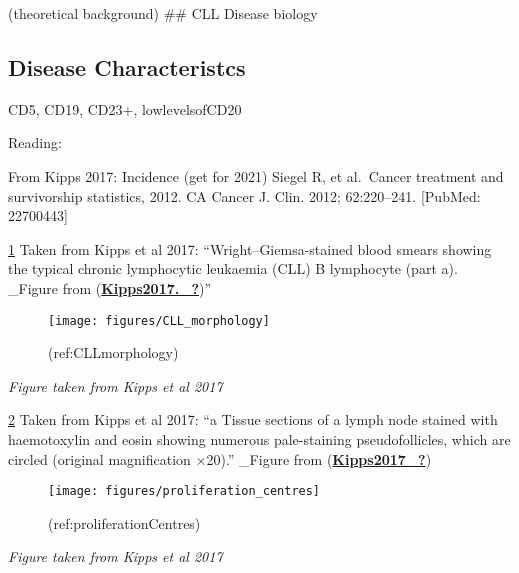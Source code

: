 \documentclass[11pt, a4paper, twosided]{book}
\begin{document}
(theoretical background)
\#\# CLL Disease biology

\hypertarget{disease-characteristcs}{%
\subsection{Disease Characteristcs}\label{disease-characteristcs}}

CD5, CD19, CD23+, lowlevelsofCD20

Reading:

From Kipps 2017:
Incidence (get for 2021)
Siegel R, et al.~Cancer treatment and survivorship statistics, 2012. CA Cancer J. Clin. 2012; 62:220--241. {[}PubMed: 22700443{]}

\ref{fig:CLLmorphology} Taken from Kipps et al 2017: ``Wright--Giemsa-stained blood smears showing the typical chronic lymphocytic leukaemia (CLL) B lymphocyte (part a). \_Figure from (\protect\hyperlink{ref-Kipps2017._}{\textbf{Kipps2017.\_?}})''
\begin{figure}

{\centering \texttt{[image: figures/CLL\_morphology]} 

}

\caption{(ref:CLLmorphology)}\label{fig:CLLmorphology}
\end{figure}
\emph{Figure taken from Kipps et al 2017}

\ref{fig:proliferationCentres} Taken from Kipps et al 2017: ``a \textbar{} Tissue sections of a lymph node stained with haemotoxylin and eosin showing numerous pale-staining pseudofollicles, which are circled (original magnification ×20).'' \_Figure from (\protect\hyperlink{ref-Kipps2017_}{\textbf{Kipps2017\_?}})
\begin{figure}

{\centering \texttt{[image: figures/proliferation\_centres]} 

}

\caption{(ref:proliferationCentres)}\label{fig:proliferationCentres}
\end{figure}
\emph{Figure taken from Kipps et al 2017}
\end{document}
